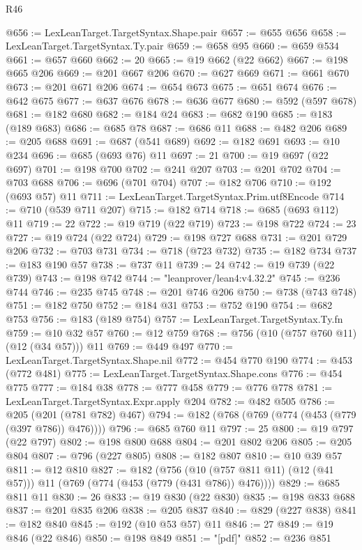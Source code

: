 \begin{lexlean}{R46}
\begin{coremodule}
@656 := LexLeanTarget.TargetSyntax.Shape.pair
@657 := @655 @656
@658 := LexLeanTarget.TargetSyntax.Ty.pair
@659 := @658 @95
@660 := @659 @534
@661 := @657 @660
@662 := 20
@665 := @19 @662 (@22 @662)
@667 := @198 @665 @206
@669 := @201 @667 @206
@670 := @627 @669
@671 := @661 @670
@673 := @201 @671 @206
@674 := @654 @673
@675 := @651 @674
@676 := @642 @675
@677 := @637 @676
@678 := @636 @677
@680 := @592 (@597 @678)
@681 := @182 @680
@682 := @184 @24
@683 := @682 @190
@685 := @183 (@189 @683)
@686 := @685 @78
@687 := @686 @11
@688 := @482 @206
@689 := @205 @688
@691 := @687 (@541 @689)
@692 := @182 @691
@693 := @10 @234
@696 := @685 (@693 @76) @11
@697 := 21
@700 := @19 @697 (@22 @697)
@701 := @198 @700
@702 := @241 @207
@703 := @201 @702
@704 := @703 @688
@706 := @696 (@701 @704)
@707 := @182 @706
@710 := @192 (@693 @57) @11
@711 := LexLeanTarget.TargetSyntax.Prim.utf8Encode
@714 := @710 (@539 @711 @207)
@715 := @182 @714
@718 := @685 (@693 @112) @11
@719 := 22
@722 := @19 @719 (@22 @719)
@723 := @198 @722
@724 := 23
@727 := @19 @724 (@22 @724)
@729 := @198 @727 @688
@731 := @201 @729 @206
@732 := @703 @731
@734 := @718 (@723 @732)
@735 := @182 @734
@737 := @183 @190 @57
@738 := @737 @11
@739 := 24
@742 := @19 @739 (@22 @739)
@743 := @198 @742
@744 := "leanprover/lean4:v4.32.2"
@745 := @236 @744
@746 := @235 @745
@748 := @201 @746 @206
@750 := @738 (@743 @748)
@751 := @182 @750
@752 := @184 @31
@753 := @752 @190
@754 := @682 @753
@756 := @183 (@189 @754)
@757 := LexLeanTarget.TargetSyntax.Ty.fn
@759 := @10 @32 @57
@760 := @12 @759
@768 := @756 (@10 (@757 @760 @11) (@12 (@34 @57))) @11
@769 := @449 @497
@770 := LexLeanTarget.TargetSyntax.Shape.nil
@772 := @454 @770 @190
@774 := @453 (@772 @481)
@775 := LexLeanTarget.TargetSyntax.Shape.cons
@776 := @454 @775
@777 := @184 @38
@778 := @777 @458
@779 := @776 @778
@781 := LexLeanTarget.TargetSyntax.Expr.apply @204
@782 := @482 @505
@786 := @205 (@201 (@781 @782) @467)
@794 := @182 (@768 (@769 (@774 (@453 (@779 (@397 @786)) @476))))
@796 := @685 @760 @11
@797 := 25
@800 := @19 @797 (@22 @797)
@802 := @198 @800 @688
@804 := @201 @802 @206
@805 := @205 @804
@807 := @796 (@227 @805)
@808 := @182 @807
@810 := @10 @39 @57
@811 := @12 @810
@827 := @182
    (@756 (@10 (@757 @811 @11) (@12 (@41 @57))) @11 (@769 (@774 (@453 (@779 (@431 @786)) @476))))
@829 := @685 @811 @11
@830 := 26
@833 := @19 @830 (@22 @830)
@835 := @198 @833 @688
@837 := @201 @835 @206
@838 := @205 @837
@840 := @829 (@227 @838)
@841 := @182 @840
@845 := @192 (@10 @53 @57) @11
@846 := 27
@849 := @19 @846 (@22 @846)
@850 := @198 @849
@851 := "[pdf]"
@852 := @236 @851

\end{coremodule}
\end{lexlean}
